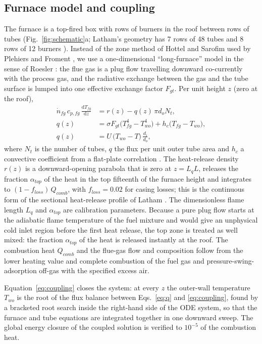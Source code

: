 \subsection{Furnace model and coupling}
\label{sec:furnace}

The furnace is a top-fired box with rows of burners in the roof between rows of tubes (Fig.~\ref{fig:schematic}a; Latham's geometry
has 7 rows of 48 tubes and 8 rows of 12 burners \cite{latham2008}). Instead of the zone method of Hottel and Sarofim
\cite{hottel1967} used by Plehiers and Froment \cite{plehiers1989}, we use a one-dimensional ``long-furnace'' model in the sense of
Roesler \cite{roesler1967}: the flue gas is a plug flow travelling downward co-currently with the process gas, and the radiative
exchange between the gas and the tube surface is lumped into one effective exchange factor $F_{gt}$. Per unit height $z$ (zero at
the roof),
\begin{align}
\dot n_{fg}\,c_{p,fg}\,\frac{\mathrm{d}T_{fg}}{\mathrm{d}z} &= r(z) - q(z)\,\pi d_o N_t, \label{eq:fg}\\
q(z) &= \sigma F_{gt}\bigl(T_{fg}^{4} - T_{wo}^{4}\bigr) + h_c\bigl(T_{fg} - T_{wo}\bigr), \label{eq:q}\\
q(z) &= U\,\bigl(T_{wo} - T\bigr)\,\frac{d_i}{d_o}, \label{eq:coupling}
\end{align}
where $N_t$ is the number of tubes, $q$ the flux per unit outer tube area and $h_c$ a convective coefficient from a flat-plate
correlation . The heat-release density $r(z)$ is a
downward-opening parabola that is zero at $z = L_q L$, releases the fraction $\alpha_{top}$ of the heat in the top fifteenth of the
furnace height and integrates to $(1-f_{loss})\,Q_{comb}$, with $f_{loss} = 0.02$ for casing losses; this is the continuous form of
the sectional heat-release profile of Latham \cite{latham2008}. The dimensionless flame length $L_q$ and $\alpha_{top}$ are
calibration parameters. Because a pure plug flow starts at the adiabatic flame temperature of the fuel mixture and would give an
unphysical cold inlet region before the first heat release, the top zone is treated as well mixed: the fraction $\alpha_{top}$ of
the heat is released instantly at the roof. The combustion heat $Q_{comb}$ and the flue-gas flow and composition follow from the
lower heating value and complete combustion of the fuel gas and pressure-swing-adsorption off-gas with the specified excess air.

Equation~\eqref{eq:coupling} closes the system: at every $z$ the outer-wall temperature $T_{wo}$ is the root of the flux balance
between Eqs.~\eqref{eq:q} and \eqref{eq:coupling}, found by a bracketed root search inside the right-hand side of the ODE system, so
that the furnace and tube equations are integrated together in one downward sweep. The global energy closure of the coupled solution
is verified to $10^{-5}$ of the combustion heat.

